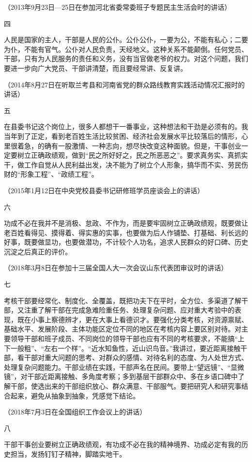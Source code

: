 \documentclass[UTF8,zihao=-4]{ctexart}
\begin{document}
（2013年9月23日—25日在参加河北省委常委班子专题民主生活会时的讲话）

四

人民是国家的主人，干部是人民的公仆。公仆公仆，一要为公，不能有私心；二要为仆，不能有官气。公仆对人民负责，天经地义。这种关系不能颠倒。任何党员、干部，只有为人民服务的责任和义务，没有当官做老爷的权力。对这个问题，我们要进一步向广大党员、干部讲清楚，而且要经常讲、反复讲。

（2014年8月27日在听取兰考县和河南省党的群众路线教育实践活动情况汇报时的讲话）

五

在县委书记这个岗位上，很多人都想干一番事业，这种想法和干劲是必须有的。我当年到了正定，看到老百姓生活比较贫困、经济社会发展水平比较落后的情形，心里很着急，的确有一股激情、一种志向，想尽快改变这种面貌。但是，干事创业一定要树立正确政绩观，做到“民之所好好之，民之所恶恶之”。要求真务实、真抓实干，做工作自觉从人民利益出发，决不能为了树立个人形象，搞华而不实、劳民伤财的“形象工程”、“政绩工程”。

（2015年1月12日在中央党校县委书记研修班学员座谈会上的讲话）

六

功成不必在我并不是消极、怠政、不作为，而是要牢固树立正确政绩观，既要做让老百姓看得见、摸得着、得实惠的实事，也要做为后人作铺垫、打基础、利长远的好事，既要做显功，也要做潜功，不计较个人功名，追求人民群众的好口碑、历史沉淀之后真正的评价。

（2018年3月8日在参加十三届全国人大一次会议山东代表团审议时的讲话）

七

考核干部要经常化、制度化、全覆盖，既把功夫下在平时，全方位、多渠道了解干部，又注重了解干部在完成急难险重任务、处理复杂问题、应对重大考验中的表现，既在小事上察德辨才，更在大事上看德识才。要强化分类考核，对资源禀赋、基础水平、发展阶段、主体功能区定位不同的地区在考核内容上要区别对待。对主要领导干部和班子成员、不同岗位的领导干部也应有不同的考核要求，不能搞“上下一般粗”、“左右一个样”。“近水知鱼性，近山识鸟音。”我讲过，要近距离接触干部，看干部对重大问题的思考、对群众的感情、对待名利的态度、为人处世方式、处理复杂问题能力。干部业绩在实践，干部声名在民间。要带上“望远镜”、“显微镜”，对干部近距离接触、多角度考察；多到基层干部群众中、多在乡语口碑中了解干部，使选出来的干部组织放心、群众满意、干部服气。要把研究人和研究事结合起来，避免从抽象到抽象，凭感觉下结论。

（2018年7月3日在全国组织工作会议上的讲话）

八

干部干事创业要树立正确政绩观，有功成不必在我的精神境界、功成必定有我的历史担当，发扬钉钉子精神，脚踏实地干。
\end{document}
